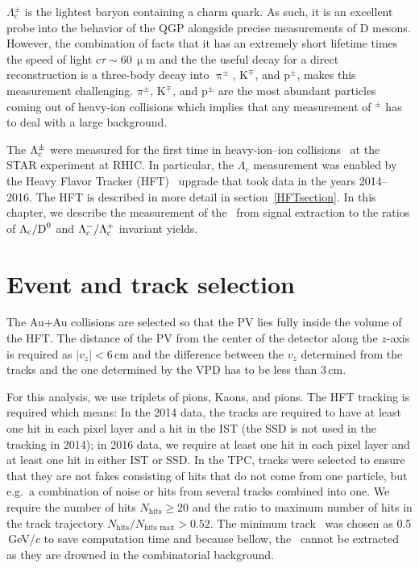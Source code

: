 $\Lambda_\mathrm{c}^\pm$ is the lightest baryon containing a charm quark. As such, it is an excellent probe into the behavior of the QGP alongside precise measurements of D mesons. However, the combination of facts that it has an extremely short lifetime times the speed of light $c\tau \sim 60\,\upmu$m and the the useful decay for a direct reconstruction is a three-body decay into $\uppi^\pm$, K$^\mp$, and p$^\pm$, makes this measurement challenging. $\pi^\pm$, K$^\mp$, and p$^\pm$ are the most abundant particles coming out of heavy-ion collisions which implies that any measurement of \Lambdac$^\pm$ has to deal with a large background.

The $\Lambda_\text{c}^\pm$ were measured for the first time in heavy-ion--ion collisions~\cite{GuannanLc} at the STAR experiment at RHIC\@. In particular, the $\Lambda_\mathrm{c}$ measurement was enabled by the Heavy Flavor Tracker (HFT)~\cite{Kapitan} upgrade that took data in the years 2014--2016\@. The HFT is described in more detail in section~\ref{HFTsection}\@. In this chapter, we describe the measurement of the \Lambdac\ from signal extraction to the ratios of $\Lambda_\text{c}/\text{D}^0$ and $\Lambda_\text{c}^-/\Lambda_\text{c}^+$ invariant yields. 

\section{Event and track selection}
The Au+Au collisions are selected so that the PV lies fully inside the volume of the HFT\@. The distance of the PV from the center of the detector along the $z$-axis is required as $|v_z| < 6\,$cm and the difference between the $v_z$ determined from the tracks and the one determined by the VPD has to be less than 3$\,$cm. 

For this analysis, we use triplets of pions, Kaons, and pions. The HFT tracking is required which means: In the 2014 data, the tracks are required to have at least one hit in each pixel layer and a hit in the IST (the SSD is not used in the tracking in 2014); in 2016 data, we require at least one hit in each pixel layer and at least one hit in either IST or SSD\@.  In the TPC, tracks were selected to ensure that they are not fakes consisting of hits that do not come from one particle, but e.g.\ a combination of noise or hits from several tracks combined into one. We require the number of hits $N_\mathrm{hits} \geq 20$ and the ratio to maximum number of hits in the track trajectory $N_\mathrm{hits}/N_\text{hits max} > 0.52$\@. The minimum track \pt\ was chosen as 0.5$\,$GeV/$c$ to save computation time and because bellow, the \Lambdac\ cannot be extracted as they are drowned in the combinatorial background\@.

